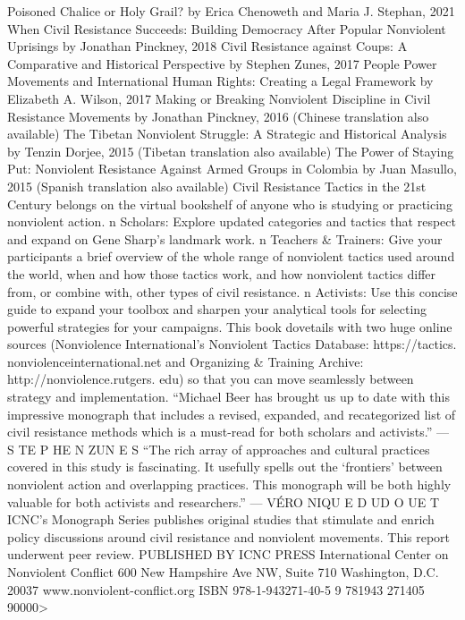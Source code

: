 \documentclass[twoside,a4paper,12pt,fleqn,openany]{extbook}
\begin{document}
Poisoned Chalice or Holy Grail?
by Erica Chenoweth and Maria J. Stephan, 2021
When Civil Resistance Succeeds: Building Democracy
After Popular Nonviolent Uprisings
by Jonathan Pinckney, 2018
Civil Resistance against Coups: A Comparative
and Historical Perspective
by Stephen Zunes, 2017
People Power Movements and International Human Rights:
Creating a Legal Framework
by Elizabeth A. Wilson, 2017
Making or Breaking Nonviolent Discipline in Civil Resistance Movements
by Jonathan Pinckney, 2016
(Chinese translation also available)
The Tibetan Nonviolent Struggle: A Strategic and Historical Analysis
by Tenzin Dorjee, 2015
(Tibetan translation also available)
The Power of Staying Put: Nonviolent Resistance
Against Armed Groups in Colombia
by Juan Masullo, 2015
(Spanish translation also available)
Civil Resistance Tactics in the 21st Century belongs on the virtual bookshelf
of anyone who is studying or practicing nonviolent action.
n Scholars: Explore updated categories and
tactics that respect and expand on Gene
Sharp's landmark work.
n Teachers & Trainers: Give your participants
a brief overview of the whole range of
nonviolent tactics used around the world,
when and how those tactics work, and how
nonviolent tactics differ from, or combine
with, other types of civil resistance.
n Activists: Use this concise guide to expand
your toolbox and sharpen your analytical
tools for selecting powerful strategies for
your campaigns.
This book dovetails with two huge online
sources (Nonviolence International’s
Nonviolent Tactics Database: https://tactics.
nonviolenceinternational.net and Organizing &
Training Archive: http://nonviolence.rutgers.
edu) so that you can move seamlessly between
strategy and implementation.
“Michael Beer has brought us up to date with this impressive
monograph that includes a revised, expanded, and recategorized
list of civil resistance methods which is a must-read for both
scholars and activists.” — S TE P HE N ZUN E S
“The rich array of approaches and cultural practices covered in
this study is fascinating. It usefully spells out the ‘frontiers’ between
nonviolent action and overlapping practices. This monograph
will be both highly valuable for both activists and researchers.”
— VÉRO NIQU E D UD O UE T
ICNC’s Monograph Series publishes original studies
that stimulate and enrich policy discussions around
civil resistance and nonviolent movements.
This report underwent peer review.
PUBLISHED BY ICNC PRESS
International Center on Nonviolent Conflict
600 New Hampshire Ave NW, Suite 710
Washington, D.C. 20037
www.nonviolent-conflict.org
ISBN 978-1-943271-40-5
9 781943 271405
90000>
\end{document}
